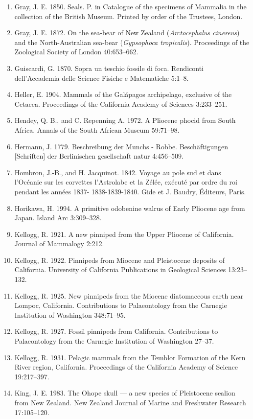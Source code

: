 \documentclass[a4paper, 12pt]{article}
\begin{document}
\begin{enumerate}
\item Gray, J. E. 1850. Seals. P. in Catalogue of the specimens of Mammalia in the collection of the British Museum. Printed by order of the Trustees, London.
\item Gray, J. E. 1872. On the sea-bear of New Zealand (\textit{Arctocephalus cinereus}) and the North-Australian sea-bear (\textit{Gypsophoca tropicalis}). Proceedings of the Zoological Society of London 40:653–662.
\item Guiscardi, G. 1870. Sopra un teschio fossile di foca. Rendiconti dell’Accademia delle Science Fisiche e Matematiche 5:1–8.
\item Heller, E. 1904. Mammals of the Gal\'{a}pagos archipelago, exclusive of the Cetacea. Proceedings of the California Academy of Sciences 3:233–251.
\item Hendey, Q. B., and C. Repenning A. 1972. A Pliocene phocid from South Africa. Annals of the South African Museum 59:71–98.
\item Hermann, J. 1779. Beschreibung der Munchs - Robbe. Beschäftigungen [Schriften] der Berlinischen gesellschaft natur 4:456–509.
\item Hombron, J.-B., and H. Jacquinot. 1842. Voyage au pole sud et dans l'Oc\'{e}anie sur les corvettes l'Astrolabe et la Z\'{e}l\'{e}e, ex\'{e}cut\'{e} par ordre du roi pendant les ann\'{e}es 1837- 1838-1839-1840. Gide et J. Baudry, \'{E}diteurs, Paris.
\item Horikawa, H. 1994. A primitive odobenine walrus of Early Pliocene age from Japan. Island Arc 3:309–328.
\item Kellogg, R. 1921. A new pinniped from the Upper Pliocene of California. Journal of Mammalogy 2:212.
\item Kellogg, R. 1922. Pinnipeds from Miocene and Pleistocene deposits of California. University of California Publications in Geological Sciences 13:23–132.
\item Kellogg, R. 1925. New pinnipeds from the Miocene diatomaceous earth near Lompoc, California. Contributions to Palaeontology from the Carnegie Institution of Washington 348:71–95.
\item Kellogg, R. 1927. Fossil pinnipeds from California. Contributions to Palaeontology from the Carnegie Institution of Washington 27–37.
\item Kellogg, R. 1931. Pelagic mammals from the Temblor Formation of the Kern River region, California. Proceedings of the California Academy of Science 19:217–397.
\item King, J. E. 1983. The Ohope skull — a new species of Pleistocene sealion from New Zealand. New Zealand Journal of Marine and Freshwater Research 17:105–120.

\end{enumerate}
\end{document}
